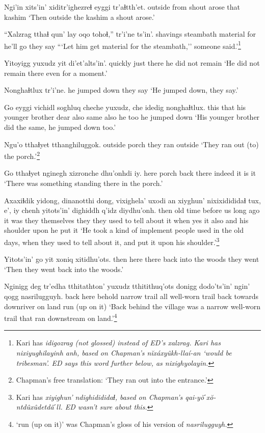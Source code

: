\documentclass[12pt]{article}
\begin{document}
\gll Ngi'in xits'in' xiditr'ighezreɬ eyggi tr'aɬtth'et.
outside  from {shout arose} that kashim
\glt `Then outside the kashim a shout arose.'
\glend

\gll ``Xalzrag {tthaɬ qun'} lay oqo  tohoɬ,'' tr'i'ne ts'in'.
 shavings        steambath material for  {he'll go}  {they say} {}
\glt ```Let him get material for the steambath,'' someone said.'\footnote{Kari has \em idigozrag \em (not glossed) instead of ED's \em xalzrag. \em Kari has \em nixiyughilayinh anh, \em based on Chapman's \em n\u{i}x\'axy\^ukh-lla\'i-an \em `would be tribesman'. ED says this word further below, as \em nixighyolayin.}
\glend

\gll Yitoyigg yuxudz yit di'et'alts'in'.
quickly just there {he did not remain}
\glt `He did not remain there even for a moment.'
\glend

\gll Nonghaɬtlux tr'i'ne.
{he jumped down} {they say}
\glt `He jumped down, they say.'
\glend

\gll Go eyggi  vichidl  soghluq cheche yuxudz, che idedig nonghaɬtlux.
this that {his younger brother} dear  also  same also {he too} {he jumped down}
\glt `His younger brother did the same, he jumped down too.'
\glend

\gll Ngu'o tthaɬyet tthanghiluggok.
outside  porch {they ran outside}
\glt `They ran out (to) the porch.'\footnote{Chapman's free translation: `They ran out into the entrance.'}
\glend

\gll Go tthaɬyet nginegh   xizronche dhu'onhdi iy.
here porch  {back there} indeed  {it is}  it
\glt `There was something standing there in the porch.'
\glend

\gll Axaxiɬdik yidong, dinanotthi dong,  vixighela' uxodi an {xiyghun' nixixidididaɬ} tux, e', iy chenh yitots'in' dighiddh q'idz diydhu'onh.
then  {old time} {before us} {long ago} {it was} {they themselves} they {they used to tell about it} when yes it also and  {his shoulder} upon {he put it}
\glt `He took a kind of implement people used in the old days, when they used to tell about it, and put it upon his shoulder.'\footnote{Kari has \em xiyighun' ndighidididaɬ, \em based on Chapman's \em qai-y\u{o}ˊx\u{o}-ntd\^ux\^udetd\"aˊll. \em ED wasn't sure about this.}
\glend

\gll Yitots'in' go yit xoniq  xitidhu'ots.
then  here there {back into the woods} {they went}
\glt `Then they went back into the woods.'
\glend

\gll Nginigg deg tr'edha tthitathton' yuxudz tthitithuq'ots donigg dodo'ts'in'  {ngin' qogg} nasrilugguyh.
back  here behold  {narrow trail} all  {well-worn trail} back  {towards downriver} {on land} {run (up on it)}
\glt `Back behind the village was a narrow well-worn trail that ran downstream on land.'\footnote{`run (up on it)' was Chapman's gloss of his version of \em nasrilugguyh.}
\glend
\end{document}
